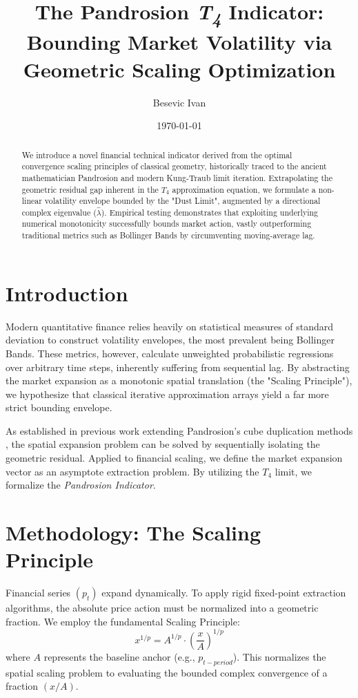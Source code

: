 \documentclass[11pt,a4paper]{article}
\title{\textbf{The Pandrosion \textit{T\textsubscript{4}} Indicator: Bounding Market Volatility via Geometric Scaling Optimization}}
\author[1]{Besevic Ivan}
\affil[1]{Independent Researcher, Algorithmic Trading Systems}
\date{\today}
\begin{document}
\maketitle

\begin{abstract}
We introduce a novel financial technical indicator derived from the optimal convergence scaling principles of classical geometry, historically traced to the ancient mathematician Pandrosion and modern Kung-Traub limit iteration. Extrapolating the geometric residual gap inherent in the $T_4$ approximation equation, we formulate a non-linear volatility envelope bounded by the "Dust Limit", augmented by a directional complex eigenvalue ($\hat{\lambda}$). Empirical testing demonstrates that exploiting underlying numerical monotonicity successfully bounds market action, vastly outperforming traditional metrics such as Bollinger Bands by circumventing moving-average lag.
\end{abstract}

\section{Introduction}
Modern quantitative finance relies heavily on statistical measures of standard deviation to construct volatility envelopes, the most prevalent being Bollinger Bands. These metrics, however, calculate unweighted probabilistic regressions over arbitrary time steps, inherently suffering from sequential lag. By abstracting the market expansion as a monotonic spatial translation (the "Scaling Principle"), we hypothesize that classical iterative approximation arrays yield a far more strict bounding envelope.

As established in previous work extending Pandrosion's cube duplication methods \cite{pandrosion_en_improved}, the spatial expansion problem can be solved by sequentially isolating the geometric residual. Applied to financial scaling, we define the market expansion vector as an asymptote extraction problem. By utilizing the $T_4$ limit, we formalize the \textit{Pandrosion Indicator}.

\section{Methodology: The Scaling Principle}
Financial series $(p_t)$ expand dynamically. To apply rigid fixed-point extraction algorithms, the absolute price action must be normalized into a geometric fraction. We employ the fundamental Scaling Principle:
\begin{equation}
    x^{1/p} = A^{1/p} \cdot \left( \frac{x}{A} \right)^{1/p}
\end{equation}
where $A$ represents the baseline anchor (e.g., $p_{t-period}$). This normalizes the spatial scaling problem to evaluating the bounded complex convergence of a fraction $(x/A)$.
\end{document}
